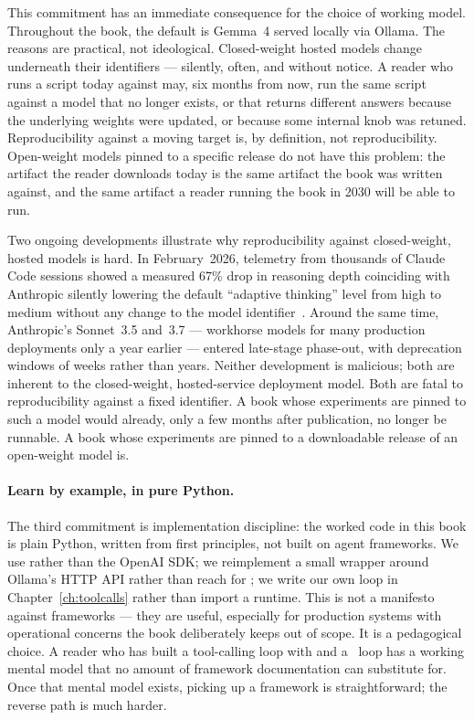 This commitment has an immediate consequence for the choice of
working model. Throughout the book, the default is Gemma~4 served
locally via Ollama. The reasons are practical, not ideological.
Closed-weight hosted models change underneath their identifiers
--- silently, often, and without notice. A reader who runs a
script today against  may, six months
from now, run the same script against a model that no longer
exists, or that returns different answers because the underlying
weights were updated, or because some internal knob was retuned.
Reproducibility against a moving target is, by definition, not
reproducibility. Open-weight models pinned to a specific release
do not have this problem: the artifact the reader downloads today
is the same artifact the book was written against, and the same
artifact a reader running the book in 2030 will be able to run.

\begin{updatebox}[title={Update --- the moving frontier}]
\small
Two ongoing developments illustrate why reproducibility against
closed-weight, hosted models is hard. In February~2026, telemetry
from thousands of Claude Code sessions showed a measured 67\%
drop in reasoning depth coinciding with Anthropic silently
lowering the default ``adaptive thinking'' level from high to
medium without any change to the model
identifier~\citep{adaptivethinking2026}. Around the same time,
Anthropic's Sonnet~3.5 and~3.7 --- workhorse models for many
production deployments only a year earlier --- entered late-stage
phase-out, with deprecation windows of weeks rather than years.
Neither development is malicious; both are inherent to the
closed-weight, hosted-service deployment model. Both are fatal to
reproducibility against a fixed identifier. A book whose
experiments are pinned to such a model would already, only a few
months after publication, no longer be runnable. A book whose
experiments are pinned to a downloadable release of an
open-weight model is.
\end{updatebox}

\paragraph{Learn by example, in pure Python.}
The third commitment is implementation discipline: the worked
code in this book is plain Python, written from first principles,
not built on agent frameworks. We use  rather than
the OpenAI SDK; we reimplement a small wrapper around Ollama's
HTTP API rather than reach for ; we write our own
loop in Chapter~\ref{ch:toolcalls} rather than import a
 runtime. This is not a manifesto against
frameworks --- they are useful, especially for production systems
with operational concerns the book deliberately keeps out of
scope. It is a pedagogical choice. A reader who has built a
tool-calling loop with  and a ~loop
has a working mental model that no amount of framework
documentation can substitute for. Once that mental model exists,
picking up a framework is straightforward; the reverse path is
much harder.

